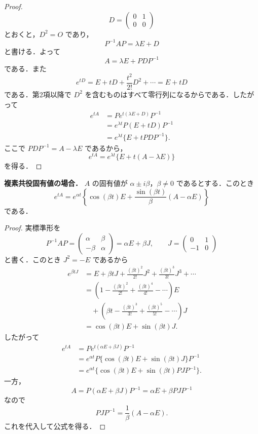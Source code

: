 \documentclass[article,paper=a4paper]{jlreq}
\begin{document}
\begin{proof}
\[
  D=
  \begin{pmatrix}
    0 & 1\\
    0 & 0
  \end{pmatrix}
\]
とおくと，$D^2=O$ であり，
\[
  P^{-1}AP=\lambda E+D
\]
と書ける．よって
\[
  A=\lambda E+PDP^{-1}
\]
である．また
\[
  e^{tD}
    =
    E+tD+\frac{t^2}{2!}D^2+\cdots
    =
    E+tD
\]
である．第2項以降で $D^2$ を含むものはすべて零行列になるからである．したがって
\begin{align*}
  e^{tA}
    &=
    P e^{t(\lambda E+D)} P^{-1}\\
    &=
    e^{\lambda t}P(E+tD)P^{-1}\\
    &=
    e^{\lambda t}\{E+tPDP^{-1}\}.
\end{align*}
ここで $PDP^{-1}=A-\lambda E$ であるから，
\[
  e^{tA}
    =
    e^{\lambda t}\{E+t(A-\lambda E)\}
\]
を得る．
\end{proof}

\begin{prop}
\textbf{複素共役固有値の場合．}
$A$ の固有値が $\alpha\pm i\beta$，$\beta\ne0$ であるとする．このとき
\[
  e^{tA}
    =
    e^{\alpha t}
    \left\{
      \cos(\beta t)E
      +\frac{\sin(\beta t)}{\beta}(A-\alpha E)
    \right\}
\]
である．
\end{prop}

\begin{proof}
実標準形を
\[
  P^{-1}AP=
  \begin{pmatrix}
    \alpha & \beta\\
    -\beta & \alpha
  \end{pmatrix}
  =
  \alpha E+\beta J,
  \qquad
  J=
  \begin{pmatrix}
    0 & 1\\
    -1 & 0
  \end{pmatrix}
\]
と書く．このとき $J^2=-E$ であるから
\begin{align*}
  e^{\beta tJ}
    &=
    E+\beta tJ+\frac{(\beta t)^2}{2!}J^2
      +\frac{(\beta t)^3}{3!}J^3+\cdots\\
    &=
    \left(1-\frac{(\beta t)^2}{2!}
      +\frac{(\beta t)^4}{4!}-\cdots\right)E\\
    &\quad+
    \left(\beta t-\frac{(\beta t)^3}{3!}
      +\frac{(\beta t)^5}{5!}-\cdots\right)J\\
    &=
    \cos(\beta t)E+\sin(\beta t)J.
\end{align*}
したがって
\begin{align*}
  e^{tA}
    &=
    P e^{t(\alpha E+\beta J)}P^{-1}\\
    &=
    e^{\alpha t}
    P\{\cos(\beta t)E+\sin(\beta t)J\}P^{-1}\\
    &=
    e^{\alpha t}
    \{\cos(\beta t)E+\sin(\beta t)PJP^{-1}\}.
\end{align*}
一方，
\[
  A=P(\alpha E+\beta J)P^{-1}
    =
    \alpha E+\beta PJP^{-1}
\]
なので
\[
  PJP^{-1}=\frac{1}{\beta}(A-\alpha E).
\]
これを代入して公式を得る．
\end{proof}
\end{document}
